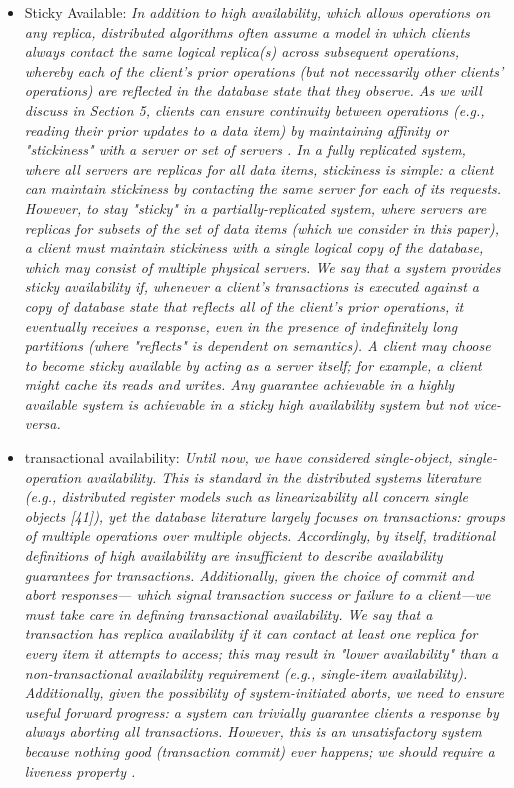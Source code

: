 \documentclass[a4paper,10pt,titlepage]{report}
\begin{document}
\begin{itemize}
        \item Sticky Available: \textit{In addition to high availability, which allows operations on any replica, distributed algorithms often assume a model in which clients always contact the same logical replica(s) across subsequent operations, whereby each of the client's prior operations (but not necessarily other clients' operations) are reflected in the database state that they observe. As we will discuss in Section 5, clients can ensure continuity between operations (e.g., reading their prior updates to a data item) by maintaining affinity or "stickiness" with a server or set of servers . In a fully replicated system, where all servers are replicas for all data items, stickiness is simple: a client can maintain stickiness by contacting the same server for each of its requests. However, to stay "sticky" in a partially-replicated system,    where servers are replicas for subsets of the set of data items (which we consider in this paper), a client must maintain stickiness with a single logical copy of the database, which may consist of multiple physical servers. We say that a system provides sticky availability if, whenever a client's transactions is executed against a copy of database state that reflects all of the client's prior operations, it eventually receives a response, even in the presence of indefinitely long partitions (where "reflects" is dependent on semantics). A client may choose to become sticky available by acting as a server itself; for example, a client might cache its reads and writes. Any guarantee achievable in a highly available system is achievable in a sticky high availability system but not vice-versa.}\cite{HighlyAvailableTransactionsVirtuesandLimitations}
        \item transactional availability: \textit{Until now, we have considered single-object, single-operation availability. This is standard in the distributed systems literature    (e.g., distributed register models such as linearizability all concern single objects [41]), yet the database literature largely focuses on transactions: groups of multiple operations over multiple objects. Accordingly, by itself, traditional definitions of high availability are insufficient to describe availability guarantees for transactions. Additionally, given the choice of commit and abort responses— which signal transaction success or failure to a client—we must take care in defining transactional availability. We say that a transaction has replica availability if it can contact at least one replica for every item it attempts to access; this may result in "lower availability" than a non-transactional availability requirement (e.g., single-item availability). Additionally, given the possibility of system-initiated aborts, we need to ensure useful forward progress: a system can trivially guarantee clients a response by always aborting all transactions. However, this is an unsatisfactory system because nothing good (transaction commit) ever happens; we should require a liveness property .
}
\end{itemize}
\end{document}

